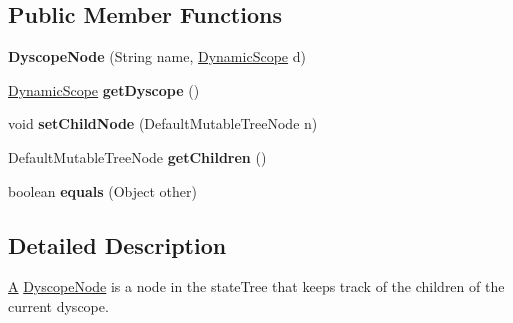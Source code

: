 \subsection*{Public Member Functions}
\begin{DoxyCompactItemize}
\item 
\hypertarget{classedu_1_1udel_1_1cis_1_1vsl_1_1civl_1_1gui_1_1common_1_1DyscopeNode_ab44c12965231a3cc4e50f3061f4cb763}{}{\bfseries Dyscope\+Node} (String name, \hyperlink{interfaceedu_1_1udel_1_1cis_1_1vsl_1_1civl_1_1state_1_1IF_1_1DynamicScope}{Dynamic\+Scope} d)\label{classedu_1_1udel_1_1cis_1_1vsl_1_1civl_1_1gui_1_1common_1_1DyscopeNode_ab44c12965231a3cc4e50f3061f4cb763}

\item 
\hypertarget{classedu_1_1udel_1_1cis_1_1vsl_1_1civl_1_1gui_1_1common_1_1DyscopeNode_a1e8216970fd5e1bb3326301c094c7d3d}{}\hyperlink{interfaceedu_1_1udel_1_1cis_1_1vsl_1_1civl_1_1state_1_1IF_1_1DynamicScope}{Dynamic\+Scope} {\bfseries get\+Dyscope} ()\label{classedu_1_1udel_1_1cis_1_1vsl_1_1civl_1_1gui_1_1common_1_1DyscopeNode_a1e8216970fd5e1bb3326301c094c7d3d}

\item 
\hypertarget{classedu_1_1udel_1_1cis_1_1vsl_1_1civl_1_1gui_1_1common_1_1DyscopeNode_a23f835c9f5bdfbec375024a97f7349ca}{}void {\bfseries set\+Child\+Node} (Default\+Mutable\+Tree\+Node n)\label{classedu_1_1udel_1_1cis_1_1vsl_1_1civl_1_1gui_1_1common_1_1DyscopeNode_a23f835c9f5bdfbec375024a97f7349ca}

\item 
\hypertarget{classedu_1_1udel_1_1cis_1_1vsl_1_1civl_1_1gui_1_1common_1_1DyscopeNode_a7166cfeb8978542439fbb22deb416df0}{}Default\+Mutable\+Tree\+Node {\bfseries get\+Children} ()\label{classedu_1_1udel_1_1cis_1_1vsl_1_1civl_1_1gui_1_1common_1_1DyscopeNode_a7166cfeb8978542439fbb22deb416df0}

\item 
\hypertarget{classedu_1_1udel_1_1cis_1_1vsl_1_1civl_1_1gui_1_1common_1_1DyscopeNode_a5f7cf77fd451af0490aba7e67abb42ea}{}boolean {\bfseries equals} (Object other)\label{classedu_1_1udel_1_1cis_1_1vsl_1_1civl_1_1gui_1_1common_1_1DyscopeNode_a5f7cf77fd451af0490aba7e67abb42ea}

\end{DoxyCompactItemize}


\subsection{Detailed Description}
\hyperlink{structA}{A} \hyperlink{classedu_1_1udel_1_1cis_1_1vsl_1_1civl_1_1gui_1_1common_1_1DyscopeNode}{Dyscope\+Node} is a node in the state\+Tree that keeps track of the children of the current dyscope. 

